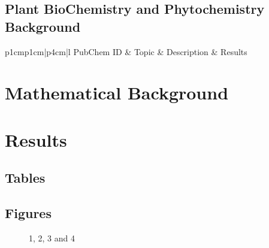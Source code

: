 \subsection{Plant BioChemistry and Phytochemistry Background}
\centering	
\begin{table}[H]\tiny
	\caption{}	
	\begin{tabular}{p{1cm}p{1cm}|p{4cm}|l}
		\hline	
		PubChem ID & Topic & Description & Results \\
		\hline 
		\hline 
	\end{tabular}
\end{table}

\section{Mathematical Background}


\section{Results}



\subsection{Tables}


\subsection{Figures}


\begin{figure}[H]
	\centering
	\begin{minipage}[b]{0.5\linewidth}
	\end{minipage}\hfill
	\begin{minipage}[b]{0.5\linewidth}
	\end{minipage}\hfill	
	\begin{minipage}[b]{0.5\linewidth}
	\end{minipage}\hfill
	\begin{minipage}[b]{0.5\linewidth}
	\end{minipage}\hfill
	\caption{1, 2, 3 and 4}
	\label{fig:Figure1}
\end{figure} 




